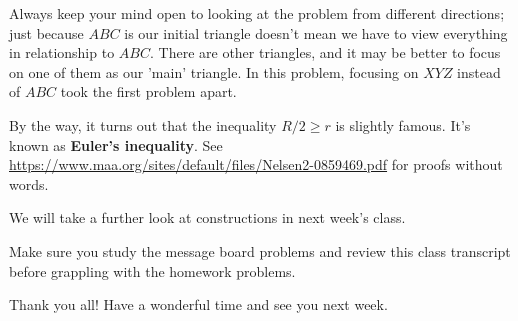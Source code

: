 Always keep your mind open to looking at the problem from different directions; just because $ABC$ is our initial triangle doesn't mean we have to view everything in relationship to $ABC.$ There are other triangles, and it may be better to focus on one of them as our 'main' triangle. In this problem, focusing on $XYZ$ instead of $ABC$ took the first problem apart.

\begin{remark}
    By the way, it turns out that the inequality $R/2 \ge r$ is slightly famous. It's known as \textbf{Euler's inequality}. See \url{https://www.maa.org/sites/default/files/Nelsen2-0859469.pdf} for proofs without words.    
\end{remark}

We will take a further look at constructions in next week's class.

Make sure you study the message board problems and review this class transcript before grappling with the homework problems.

Thank you all! Have a wonderful time and see you next week. 


